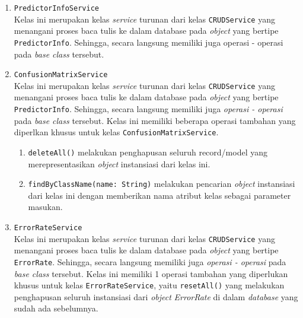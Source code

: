\begin{enumerate}
\begin{enumerate}
	\end{enumerate}
	
	\item \texttt{PredictorInfoService}\\
	Kelas ini merupakan kelas \textit{service} turunan dari kelas \texttt{CRUDService} yang menangani proses baca tulis ke dalam database pada \textit{object} yang bertipe \texttt{PredictorInfo}. Sehingga, secara langsung memiliki juga operasi - operasi pada \textit{base class} tersebut. 
	
	\item \texttt{ConfusionMatrixService}\\
	Kelas ini merupakan kelas \textit{service} turunan dari kelas \texttt{CRUDService} yang menangani proses baca tulis ke dalam database pada \textit{object} yang bertipe \texttt{PredictorInfo}. Sehingga, secara langsung memiliki juga \textit{operasi - operasi} pada \textit{base class} tersebut. Kelas ini memiliki beberapa operasi tambahan yang diperlkan khusus untuk kelas \texttt{ConfusionMatrixService}.
	\begin{enumerate}
		\item \texttt{deleteAll()} melakukan penghapusan seluruh record/model yang merepresentasikan \textit{object} instansiasi dari kelas ini.
		\item \texttt{findByClassName(name: String)} melakukan pencarian \textit{object} instansiasi dari kelas ini dengan memberikan nama atribut kelas sebagai parameter masukan.
	\end{enumerate}
	
	\item \texttt{ErrorRateService}\\
	Kelas ini merupakan kelas \textit{service} turunan dari kelas \texttt{CRUDService} yang menangani proses baca tulis ke dalam database pada \textit{object} yang bertipe \texttt{ErrorRate}. Sehingga, secara langsung memiliki juga \textit{operasi - operasi} pada \textit{base class} tersebut. Kelas ini memiliki 1 operasi tambahan yang diperlukan khusus untuk kelas \texttt{ErrorRateService}, yaitu \texttt{resetAll()} yang melakukan penghapusan seluruh instansiasi dari \textit{object} \textit{ErrorRate} di dalam \textit{database} yang sudah ada sebelumnya.
	

\end{enumerate}
